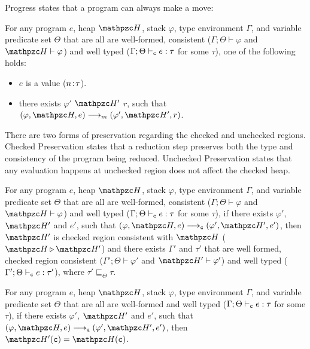 Progress states that a \lang program can always make a move:

\begin{thm}[Progress]\label{thm:progress}

For any \lang program $e$, heap $\heap$, stack
$\varphi$, type environment $\Gamma$, and variable predicate set $\Theta$
that are all are well-formed, consistent
($\Gamma;\Theta\vdash \varphi$ and $\heap \vdash \varphi$) and well
typed ($\Gamma;\Theta\vdash_{\texttt{c}} e : \tau$ for some $\tau$),
one of the following holds:

\begin{itemize}

\item $e$ is a value (${n}\!:\!{\tau}$).

\item there exists $\varphi'$ $\heap'$ $r$, such that $(\varphi,\heap,e) \longrightarrow_m (\varphi',\heap',r)$.

\end{itemize}
\end{thm}

\noindent
There are two forms of preservation regarding the checked and unchecked regions.
Checked Preservation states that a reduction step preserves both the
type and consistency of the program being reduced.
Unchecked Preservation states that any evaluation happens at unchecked region does not affect the checked heap.

\begin{thm}
For any \lang program $e$, heap $\heap$, stack
$\varphi$, type environment $\Gamma$, and variable predicate set $\Theta$
that are all are well-formed, consistent
($\Gamma;\Theta\vdash \varphi$ and $\heap \vdash \varphi$) and well
typed ($\Gamma;\Theta\vdash_{\texttt{c}} e : \tau$ for some $\tau$), if there exists $\varphi'$,
$\heap'$ and $e'$, such that $(\varphi,\heap,e)
\longrightarrow_{\cmode} (\varphi',\heap',e')$, then $\heap'$ is
checked region consistent with $\heap$ ($\heap \triangleright \heap'$) and there exists
$\Gamma'$ and $\tau'$ that are well formed, checked region consistent
($\Gamma';\Theta\vdash \varphi'$ and $\heap' \vdash \varphi'$) and
well typed ($\Gamma';\Theta \vdash_{\texttt{c}} e: \tau'$), where
$\tau'\sqsubseteq_{\Theta} \tau$.
\end{thm}
\begin{thm}
For any \lang program $e$, heap $\heap$, stack
$\varphi$, type environment $\Gamma$, and variable predicate set $\Theta$
that are all are well-formed and well
typed ($\Gamma;\Theta\vdash_{\texttt{c}} e : \tau$ for some $\tau$), if there exists $\varphi'$,
$\heap'$ and $e'$, such that $(\varphi,\heap,e)
\longrightarrow_{\umode} (\varphi',\heap',e')$, then $\heap'(\cmode)=\heap(\cmode)$.
\end{thm}

